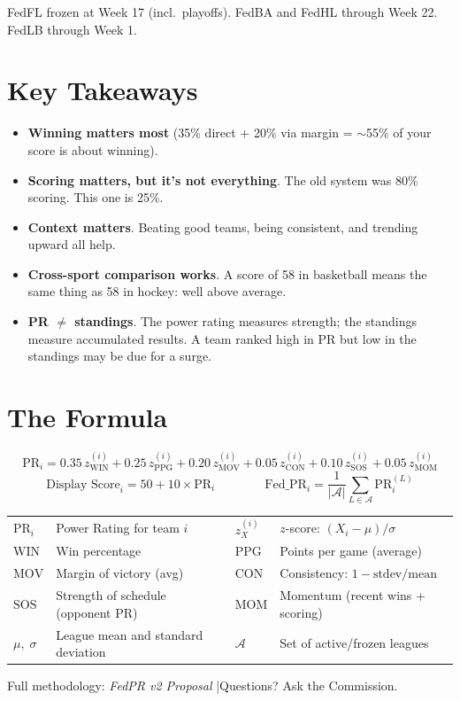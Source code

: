 \documentclass[11pt,letterpaper]{article}
\begin{document}
\vspace{-2pt}
{\small\color{dimgray} FedFL frozen at Week 17 (incl.\ playoffs). FedBA and FedHL through Week 22. FedLB through Week 1.}

\section{Key Takeaways}

\begin{itemize}[nosep, leftmargin=1.5em]
\item \textbf{Winning matters most} (35\% direct + 20\% via margin = $\sim$55\% of your score is about winning).
\item \textbf{Scoring matters, but it's not everything}. The old system was 80\% scoring. This one is 25\%.
\item \textbf{Context matters}. Beating good teams, being consistent, and trending upward all help.
\item \textbf{Cross-sport comparison works}. A score of 58 in basketball means the same thing as 58 in hockey: well above average.
\item \textbf{PR $\neq$ standings}. The power rating measures strength; the standings measure accumulated results. A team ranked high in PR but low in the standings may be due for a surge.
\end{itemize}

\section{The Formula}

\vspace{-2pt}
\colorbox{fedlight}{\parbox{0.95\textwidth}{\vspace{4pt}
\[
\text{PR}_i = 0.35\, z_{\text{WIN}}^{(i)} + 0.25\, z_{\text{PPG}}^{(i)} + 0.20\, z_{\text{MOV}}^{(i)} + 0.05\, z_{\text{CON}}^{(i)} + 0.10\, z_{\text{SOS}}^{(i)} + 0.05\, z_{\text{MOM}}^{(i)}
\]
\[
\text{Display Score}_i = 50 + 10 \times \text{PR}_i \qquad\qquad \text{Fed\_PR}_i = \frac{1}{|\mathcal{A}|} \sum_{L \in \mathcal{A}} \text{PR}_i^{(L)}
\]
\vspace{1pt}}}

\vspace{4pt}
{\small
\begin{tabular}{@{}ll@{\qquad}ll@{}}
$\text{PR}_i$ & Power Rating for team $i$ & $z_X^{(i)}$ & $z$-score: $(X_i - \mu) / \sigma$ \\
$\text{WIN}$ & Win percentage & $\text{PPG}$ & Points per game (average) \\
$\text{MOV}$ & Margin of victory (avg) & $\text{CON}$ & Consistency: $1 - \text{stdev}/\text{mean}$ \\
$\text{SOS}$ & Strength of schedule (opponent PR) & $\text{MOM}$ & Momentum (recent wins + scoring) \\
$\mu,\; \sigma$ & League mean and standard deviation & $\mathcal{A}$ & Set of active/frozen leagues \\
\end{tabular}
}

\vfill
\begin{center}
{\small\color{dimgray} Full methodology: \textit{FedPR v2 Proposal} \quad|\quad Questions? Ask the Commission.}
\end{center}
\end{document}
